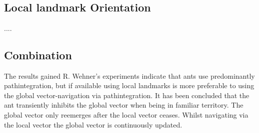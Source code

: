 \documentclass[11pt]{article}
\begin{document}
\ \\



\subsection{Local landmark Orientation}
....


\subsection{Combination} \label{Sec:Combination}
The results gained R. Wehner's experiments indicate that ants use predominantly pathintegration, but if available using local landmarks is more preferable to using the global vector-navigation via pathintegration. It has been concluded that the ant transiently inhibits the global vector when being in familiar territory. The global vector only reemerges after the local vector ceases. Whilst navigating via the local vector the global vector is continuously updated.
\\ \
\end{document}
